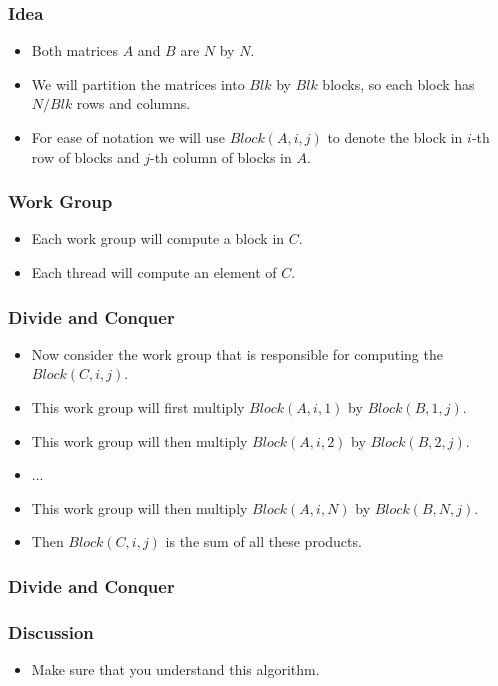 \documentclass{beamer}
\begin{document}
\begin{frame}
  \frametitle{Idea}
  \begin{itemize}
    \item Both matrices $A$ and $B$ are $N$ by $N$.
    \item We will partition the matrices into $Blk$ by $Blk$ blocks,
      so each block has $N / Blk$ rows and columns.
    \item For ease of notation we will use $Block(A, i, j)$ to denote
      the block in $i$-th row of blocks and $j$-th column of blocks in
      $A$.
  \end{itemize}
\end{frame}

\begin{frame}
  \frametitle{Work Group}
  \begin{itemize}
  \item Each work group will compute a block in $C$.
  \item Each thread will compute an element of $C$.
  \end{itemize}
\end{frame}

\begin{frame}
  \frametitle{Divide and Conquer}
  \begin{itemize}
  \item Now consider the work group that is responsible for
    computing the $Block(C, i, j)$.
  \item This work group will first multiply $Block(A, i, 1)$ by
    $Block(B, 1, j)$.
  \item This work group will then multiply $Block(A, i, 2)$ by
    $Block(B, 2, j)$.
  \item ...
  \item This work group will then multiply $Block(A, i, N)$ by
    $Block(B, N, j)$.
  \item Then $Block(C, i, j)$ is the sum of all these products.
  \end{itemize}
\end{frame}

\begin{frame}
  \frametitle{Divide and Conquer}
  \centerline{}
\end{frame}

\begin{frame}
  \frametitle{Discussion}
  \begin{itemize}
  \item Make sure that you understand this algorithm.
  \end{itemize}
\end{frame}
\end{document}
